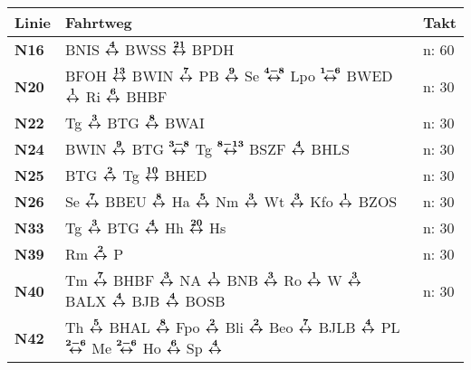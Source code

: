 \begin{minipage}[t]{0.45\textwidth}
\begin{tabular}{>{\bfseries}L{1.2cm}L{9.0cm}L{3.0cm}}
{\bfseries Linie} & {\bfseries Fahrtweg} & {\bfseries Takt} \\
\hline
\nbus{} N16   & BNIS $\xarwe{4}$ BWSS $\xarwe{21}$ BPDH                                                                                                                             & n: 60                      \\
\nbus{} N20   & BFOH $\xarwe{13}$ BWIN $\xarwe{7}$ PB $\xarwe{9}$ Se $\xarwe{4-8}$ Lpo $\xarwe{1-6}$ BWED $\xarwe{1}$ Ri $\xarwe{6}$ BHBF                                           & n: 30                      \\
\nbus{} N22   & Tg $\xarwe{3}$ BTG $\xarwe{8}$ BWAI                                                                                                                                 & n: 30                      \\
\nbus{} N24   & BWIN $\xarwe{9}$ BTG $\xarwe{3-8}$ Tg $\xarwe{8-13}$ BSZF $\xarwe{4}$ BHLS
& n: 30                      \\
\nbus{} N25   & BTG $\xarwe{2}$ Tg $\xarwe{10}$ BHED                                                                                                                                & n: 30                      \\
\nbus{} N26   & Se $\xarwe{7}$ BBEU $\xarwe{8}$ Ha $\xarwe{5}$ Nm $\xarwe{3}$ Wt $\xarwe{3}$ Kfo $\xarwe{1}$ BZOS                                                                   & n: 30                      \\
\nbus{} N33   & Tg $\xarwe{3}$ BTG $\xarwe{4}$ Hh $\xarwe{20}$ Hs                                                                                                                   & n: 30                      \\
\nbus{} N39   & Rm $\xarwe{2}$ P                                                                                                                                                    & n: 30                      \\
\nbus{} N40   & Tm $\xarwe{7}$ BHBF $\xarwe{3}$ NA $\xarwe{1}$ BNB $\xarwe{3}$ Ro $\xarwe{1}$ W $\xarwe{3}$ BALX $\xarwe{4}$ BJB $\xarwe{4}$ BOSB                                   & n: 30                      \\
\nbus{} N42   & Th $\xarwe{5}$ BHAL $\xarwe{8}$ Fpo $\xarwe{2}$ Bli $\xarwe{2}$ Beo $\xarwe{7}$ BJLB $\xarwe{4}$ PL $\xarwe{2-6}$ Me $\xarwe{2-6}$ Ho $\xarwe{6}$ Sp $\xarwe{4}$    %

\end{tabular}
\end{minipage}
